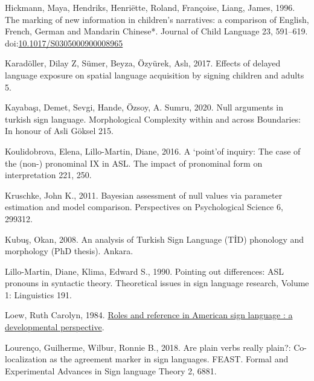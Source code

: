 \documentclass[]{elsarticle} %
\newlength{\cslhangindent}
\newenvironment{CSLReferences}[2] %
 {%
  \setlength{\parindent}{0pt}
  \ifodd #1 \everypar{\setlength{\hangindent}{\cslhangindent}}\ignorespaces\fi
  \ifnum #2 > 0
  \setlength{\parskip}{#2\baselineskip}
  \fi
 }%
 {}
\begin{document}
\begin{CSLReferences}{1}{0}
\leavevmode{}%
Hickmann, Maya, Hendriks, Henriëtte, Roland, Françoise, Liang, James,
1996. The marking of new information in children's narratives: a
comparison of English, French, German and Mandarin Chinese*. Journal of
Child Language 23, 591--619.
doi:\href{https://doi.org/10.1017/S0305000900008965}{10.1017/S0305000900008965}

\leavevmode{}%
Karadöller, Dilay Z, Sümer, Beyza, Özyürek, Aslı, 2017. Effects of
delayed language exposure on spatial language acquisition by signing
children and adults 5.

\leavevmode{}%
Kayabaşı, Demet, Sevgi, Hande, Özsoy, A. Sumru, 2020. Null arguments in
turkish sign language. Morphological Complexity within and across
Boundaries: In honour of Asli Göksel 215.

\leavevmode{}%
Koulidobrova, Elena, Lillo-Martin, Diane, 2016. A {`}point{'}of inquiry:
The case of the (non-) pronominal IX in ASL. The impact of pronominal
form on interpretation 221, 250.

\leavevmode{}%
Kruschke, John K., 2011. Bayesian assessment of null values via
parameter estimation and model comparison. Perspectives on Psychological
Science 6, 299312.

\leavevmode{}%
Kubuş, Okan, 2008. An analysis of Turkish Sign Language (T{İ}D)
phonology and morphology (PhD thesis). Ankara.

\leavevmode{}%
Lillo-Martin, Diane, Klima, Edward S., 1990. Pointing out differences:
ASL pronouns in syntactic theory. Theoretical issues in sign language
research, Volume 1: Linguistics 191.

\leavevmode{}%
Loew, Ruth Carolyn, 1984.
\href{https:///paper/Roles-and-reference-in-American-sign-language-\%3A-a-Loew/315c2c539d3bd88fbc13564775141ba4a60ac5aa}{Roles
and reference in American sign language : a developmental perspective}.

\leavevmode{}%
Lourenço, Guilherme, Wilbur, Ronnie B., 2018. Are plain verbs really
plain?: Co-localization as the agreement marker in sign languages.
FEAST. Formal and Experimental Advances in Sign language Theory 2, 6881.


\end{CSLReferences}
\end{document}
